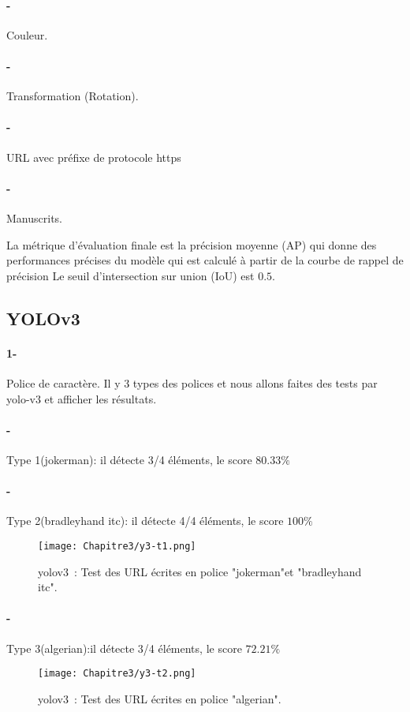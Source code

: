      \paragraph{-} Couleur.
     \paragraph{-} Transformation (Rotation).
     \paragraph{-} URL avec préfixe de protocole https
     \paragraph{-} Manuscrits.
     
     La métrique d'évaluation finale est la précision moyenne (AP) qui donne des performances précises du modèle qui est calculé à partir de la courbe de rappel de précision
     Le seuil d'intersection sur union (IoU) est $0.5$.

     \subsection{YOLOv3}
      \paragraph{1-} Police de caractère.
         Il y  3 types des polices  et nous allons faites des tests par yolo-v3 et afficher les résultats.
        \paragraph{-}Type 1(jokerman): il détecte 3/4 éléments, le score $80.33\%$
        \paragraph{-}Type 2(bradleyhand itc): il détecte 4/4 éléments, le score $100\%$

        \begin{figure}[H]
              \centering
               \texttt{[image: Chapitre3/y3-t1.png]}
               \caption{yolov3 : Test des URL écrites en police "jokerman"et "bradleyhand itc".}
               \label{y3_t1}
               \end{figure}
        \paragraph{-}Type 3(algerian):il détecte 3/4 éléments, le score $72.21\%$
        \begin{figure}[H]
          \centering
           \texttt{[image: Chapitre3/y3-t2.png]}
           \caption{yolov3 : Test des URL écrites en police "algerian".}
           \label{y3_t2}
           \end{figure}
